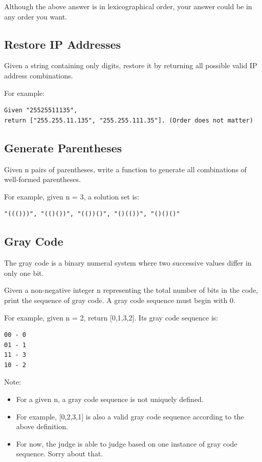 \documentclass[11pt]{book}
\begin{document}
Although the above answer is in lexicographical order, your answer could be in any order you want.
\subsection{Restore IP Addresses}
\label{sec-16-4-2}
Given a string containing only digits, restore it by returning all possible valid IP address combinations.

For example:
\lstset{language=java,label= ,caption= ,numbers=none}
\begin{lstlisting}
Given "25525511135",
return ["255.255.11.135", "255.255.111.35"]. (Order does not matter)
\end{lstlisting}
\subsection{Generate Parentheses}
\label{sec-16-4-3}
Given n pairs of parentheses, write a function to generate all combinations of well-formed parentheses.

For example, given n = 3, a solution set is:
\lstset{language=java,label= ,caption= ,numbers=none}
\begin{lstlisting}
"((()))", "(()())", "(())()", "()(())", "()()()"
\end{lstlisting}
\subsection{Gray Code}
\label{sec-16-4-4}
The gray code is a binary numeral system where two successive values differ in only one bit.

Given a non-negative integer n representing the total number of bits in the code, print the sequence of gray code. A gray code sequence must begin with 0.

For example, given n = 2, return [0,1,3,2]. Its gray code sequence is:
\lstset{language=java,label= ,caption= ,numbers=none}
\begin{lstlisting}
00 - 0
01 - 1
11 - 3
10 - 2
\end{lstlisting}
Note:
\begin{itemize}
\item For a given n, a gray code sequence is not uniquely defined.
\item For example, [0,2,3,1] is also a valid gray code sequence according to the above definition.
\item For now, the judge is able to judge based on one instance of gray code sequence. Sorry about that.
\end{itemize}
\end{document}
